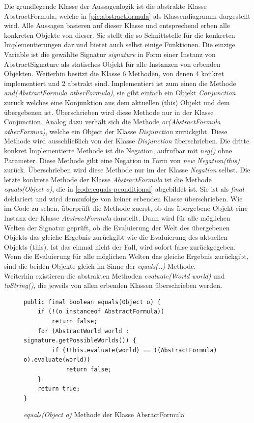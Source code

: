 \documentclass[12pt,a4paper]{article}
\begin{document}
Die grundlegende Klasse der Aussagenlogik ist die abstrakte Klasse AbstractFormula, welche in \autoref{pic:abstractformula} als Klassendiagramm dargestellt wird. Alle Aussagen basieren auf dieser Klasse und entsprechend erben alle konkreten Objekte von dieser. Sie stellt die so Schnittstelle für die konkreten Implementierungen dar und bietet auch selbst einige Funktionen. Die einzige Variable ist die gewählte Signatur \textit{signature} in Form einer Instanz von AbstractSignature als statisches Objekt für alle Instanzen von erbenden Objekten. Weiterhin besitzt die Klasse 6 Methoden, von denen 4 konkret implementiert und 2 abstrakt sind. Implementiert ist zum einen die Methode \textit{and(AbstractFormula otherFormula)}, sie gibt einfach ein Objekt \textit{Conjunction} zurück welches eine Konjunktion aus dem aktuellen (this) Objekt und dem übergebenen ist. Überschrieben wird diese Methode nur in der Klasse Conjunction. Analog dazu verhält sich die Methode \textit{or(AbstractFormula otherFormua)}, welche ein Object der Klasse \textit{Disjunction} zurückgibt. Diese Methode wird ausschließlich von der Klasse \textit{Disjunction} überschrieben. Die dritte konkret Implementierte Methode ist die Negation, aufrufbar mit \textit{neg()} ohne Parameter. Diese Methode gibt eine Negation in Form von \textit{new Negation(this)} zurück. Überschrieben wird diese Methode nur im der Klasse \textit{Negation} selbst. Die letzte konkrete Methode der Klasse \textit{AbstractFormula} ist die Methode \textit{equals(Object o)}, die in \autoref{code:equals-pconditional} abgebildet ist. Sie ist als \textit{final} deklariert und wird demzufolge von keiner erbenden Klasse überschrieben. Wie im Code zu sehen, überprüft die Methode zuerst, ob das übergebene Objekt eine Instanz der Klasse \textit{AbstractFormula} darstellt. Dann wird für alle möglichen Welten der Signatur geprüft, ob die Evaluierung der Welt des übergebenen Objekts das gleiche Ergebnis zurückgibt wie die Evaluierung des aktuellen Objekts (this). Ist das einmal nicht der Fall, wird sofort false zurückgegeben. Wenn die Evaluierung für alle möglichen Welten das gleiche Ergebnis zurückgibt, sind die beiden Objekte gleich im Sinne der \textit{equals(..)} Methode. \\
Weiterhin existieren die abstrakten Methoden \textit{evaluate(World world)} und \textit{toString()}, die jeweils von allen erbenden Klassen überschrieben werden.


\begin{figure}
\begin{lstlisting}
public final boolean equals(Object o) {
    if (!(o instanceof AbstractFormula))
        return false;
    for (AbstractWorld world : signature.getPossibleWorlds()) {
        if (!this.evaluate(world) == ((AbstractFormula) o).evaluate(world))
            return false;
    }
    return true;
}
\end{lstlisting}
\caption{\textit{equals(Object o)} Methode der Klasse AbsractFormula}
\label{code:equals-pconditional}
\end{figure} 
\end{document}
